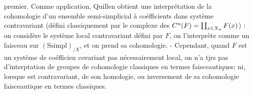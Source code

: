 premier. Comme application, Quillen obtient une interprétation  de la cohomologie d'un ensemble semi-simplicial à coéfficients dans  système  contravariant   (défini classiquement par le complexe  des $C^n(F)=\coprod_{x\in X_n}F(x)$) : on considère le système local contravariant défini par $F$, on l'interprète comme un faisceau sur  $(\mathrm{Ssimpl})_{/X}$, et on prend sa cohomologie. - Cependant, quand $F$ est un système de coéfficien covariant pas nécessairement local, on n'a tjrs pas d'interptation de  groupes de cohomologie classiques en termes faisceautiques; ni, lorsque  est contravariant, de son homologie, ou inversement de sa cohomologie faisceautique en termes classiques.

